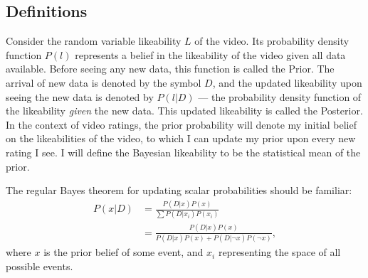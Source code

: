 \documentclass[a4paper,11pt]{article}
\begin{document}
\subsection{Definitions}
Consider the random variable likeability $L$ of the video. Its probability density function $P(l)$ represents a belief in the likeability of the video given all data available. Before seeing any new data, this function is called the Prior. The arrival of new data is denoted by the symbol $D$, and the updated likeability upon seeing the new data is denoted by $P(l | D)$ --- the probability density function of the likeability \textit{given} the new data. This updated likeability is called the Posterior. In the context of video ratings, the prior probability will denote my initial belief on the likeabilities of the video, to which I can update my prior upon every new rating I see. I will define the Bayesian likeability to be the statistical mean of the prior.





The regular Bayes theorem for updating scalar probabilities should be familiar:
\begin{align*}
    P(x|D) &= \frac{P(D|x) P(x)}{\sum P(D|x_i) P(x_i) }\\
     &= \frac{P(D|x)P(x)}{P(D|x)P(x) + P(D|\neg x)P(\neg x)},
\end{align*}
where $x$ is the prior belief of some event, and $x_i$ representing the space of all possible events.
\end{document}
